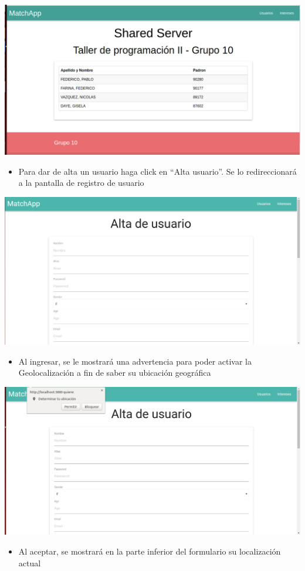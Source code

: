 \documentclass[letterpaper,10pt,english]{sphinxmanual}
\begin{document}
\includegraphics{shared_portada.png}
\begin{itemize}
\item {} 
Para dar de alta un usuario haga click en “Alta usuario”. Se lo redireccionará a la pantalla de registro de usuario

\end{itemize}

\includegraphics{shared_altaUsuario.png}
\begin{itemize}
\item {} 
Al ingresar, se le mostrará una advertencia para poder activar la Geolocalización a fin de saber su ubicación geográfica

\end{itemize}

\includegraphics{shared_localizacion.png}
\begin{itemize}
\item {} 
Al aceptar, se mostrará en la parte inferior del formulario su localización actual

\end{itemize}
\end{document}
